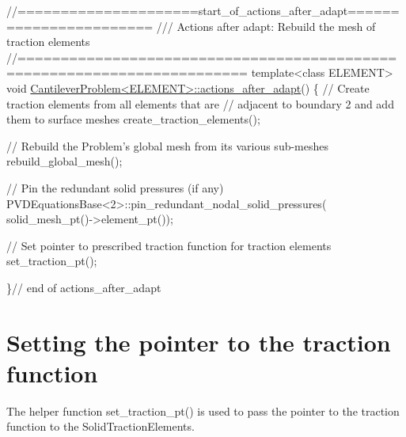  
\begin{DoxyCodeInclude}
\textcolor{comment}{//=====================start\_of\_actions\_after\_adapt=======================}
\textcolor{comment}{///  Actions after adapt: Rebuild the mesh of traction elements}
\textcolor{comment}{}\textcolor{comment}{//========================================================================}
\textcolor{keyword}{template}<\textcolor{keyword}{class} ELEMENT>
\textcolor{keywordtype}{void} \hyperlink{classCantileverProblem_af4d135ace3eac657b38de362e1644c75}{CantileverProblem<ELEMENT>::actions\_after\_adapt}()
\{
 \textcolor{comment}{// Create traction elements from all elements that are }
 \textcolor{comment}{// adjacent to boundary 2 and add them to surface meshes}
 create\_traction\_elements();
 
 \textcolor{comment}{// Rebuild the Problem's global mesh from its various sub-meshes}
 rebuild\_global\_mesh();
 
 \textcolor{comment}{// Pin the redundant solid pressures (if any)}
 PVDEquationsBase<2>::pin\_redundant\_nodal\_solid\_pressures(
  solid\_mesh\_pt()->element\_pt());

 \textcolor{comment}{// Set pointer to prescribed traction function for traction elements}
 set\_traction\_pt();
 
\}\textcolor{comment}{// end of actions\_after\_adapt}

\end{DoxyCodeInclude}




 

\hypertarget{index_set_traction}{}\section{Setting the pointer to the traction function}\label{index_set_traction}
The helper function {\ttfamily set\+\_\+traction\+\_\+pt()} is used to pass the pointer to the traction function to the {\ttfamily Solid\+Traction\+Elements}.

